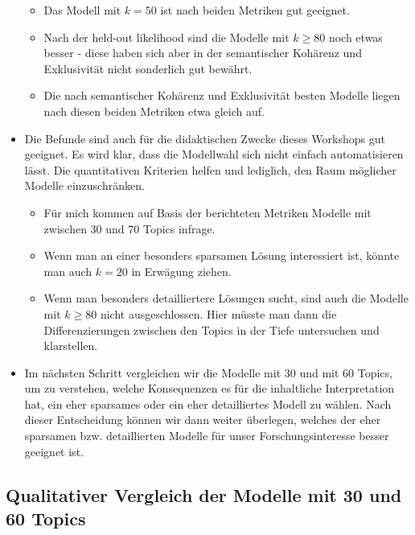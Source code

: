\documentclass[
]{book}
\providecommand{\tightlist}{%
  \setlength{\itemsep}{0pt}\setlength{\parskip}{0pt}}
\begin{document}
\begin{itemize}
  \begin{itemize}
  \tightlist
  \item
    Das Modell mit \(k = 50\) ist nach beiden Metriken gut geeignet.
  \item
    Nach der held-out likelihood sind die Modelle mit \(k \ge 80\) noch etwas besser - diese haben sich aber in der semantischer Kohärenz und Exklusivität nicht sonderlich gut bewährt.
  \item
    Die nach semantischer Kohärenz und Exklusivität besten Modelle liegen nach diesen beiden Metriken etwa gleich auf.
  \end{itemize}
\item
  Die Befunde sind auch für die didaktischen Zwecke dieses Workshops gut geeignet. Es wird klar, dass die Modellwahl sich nicht einfach automatisieren lässt. Die quantitativen Kriterien helfen und lediglich, den Raum möglicher Modelle einzuschränken.

  \begin{itemize}
  \tightlist
  \item
    Für mich kommen auf Basis der berichteten Metriken Modelle mit zwischen 30 und 70 Topics infrage.
  \item
    Wenn man an einer besonders sparsamen Lösung interessiert ist, könnte man auch \(k = 20\) in Erwägung ziehen.
  \item
    Wenn man besonders detailliertere Lösungen sucht, sind auch die Modelle mit \(k \ge 80\) nicht ausgeschlossen. Hier müsste man dann die Differenzierungen zwischen den Topics in der Tiefe untersuchen und klarstellen.
  \end{itemize}
\item
  Im nächsten Schritt vergleichen wir die Modelle mit 30 und mit 60 Topics, um zu verstehen, welche Konsequenzen es für die inhaltliche Interpretation hat, ein eher sparsames oder ein eher detailliertes Modell zu wählen. Nach dieser Entscheidung können wir dann weiter überlegen, welches der eher sparsamen bzw. detaillierten Modelle für unser Forschungsinteresse besser geeignet ist.
\end{itemize}

\hypertarget{qualitativer-vergleich-der-modelle-mit-30-und-60-topics}{%
\subsection*{Qualitativer Vergleich der Modelle mit 30 und 60 Topics}\label{qualitativer-vergleich-der-modelle-mit-30-und-60-topics}}
\end{document}
